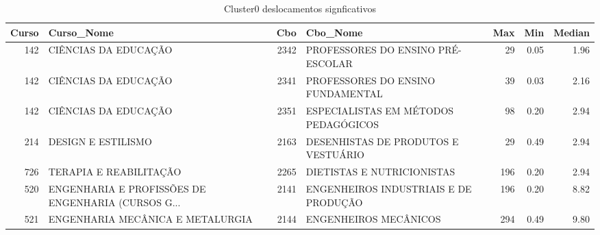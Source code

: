 \begin{table}
\centering
\caption{Cluster0 deslocamentos signficativos }
\label{tab:Salarios_Cluster0}
\begin{tabular}{rlrlrrr}
\toprule
 Curso &                                         Curso\_Nome &  Cbo &                              Cbo\_Nome &  Max &  Min &  Median \\
\midrule
   142 &                               CIÊNCIAS DA EDUCAÇÃO & 2342 &     PROFESSORES DO ENSINO PRÉ-ESCOLAR &   29 & 0.05 &    1.96 \\
   142 &                               CIÊNCIAS DA EDUCAÇÃO & 2341 &     PROFESSORES DO ENSINO FUNDAMENTAL &   39 & 0.03 &    2.16 \\
   142 &                               CIÊNCIAS DA EDUCAÇÃO & 2351 &  ESPECIALISTAS EM MÉTODOS PEDAGÓGICOS &   98 & 0.20 &    2.94 \\
   214 &                                 DESIGN E ESTILISMO & 2163 &  DESENHISTAS DE PRODUTOS E  VESTUÁRIO &   29 & 0.49 &    2.94 \\
   726 &                             TERAPIA E REABILITAÇÃO & 2265 &            DIETISTAS E NUTRICIONISTAS &  196 & 0.20 &    2.94 \\
   520 & ENGENHARIA E PROFISSÕES DE ENGENHARIA (CURSOS G... & 2141 & ENGENHEIROS INDUSTRIAIS E DE PRODUÇÃO &  196 & 0.20 &    8.82 \\
   521 &                   ENGENHARIA MECÂNICA E METALURGIA & 2144 &                 ENGENHEIROS MECÂNICOS &  294 & 0.49 &    9.80 \\
\bottomrule
\end{tabular}
\end{table}
